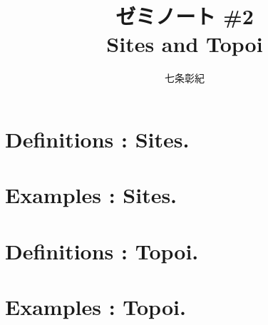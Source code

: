\documentclass[a4paper]{jsarticle}
\begin{document}
\title{ゼミノート \#2 \\ Sites and Topoi}
\author{七条彰紀}
\maketitle

\section{Definitions : Sites.}

\section{Examples : Sites.}

\section{Definitions : Topoi.}
\section{Examples : Topoi.}



\end{document}
